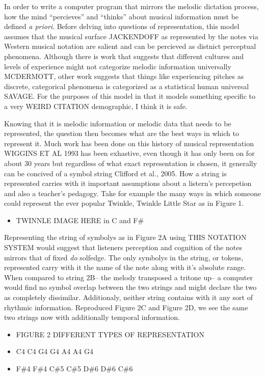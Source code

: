 \documentclass[]{book}
\providecommand{\tightlist}{%
  \setlength{\itemsep}{0pt}\setlength{\parskip}{0pt}}
\theoremstyle{definition}
\theoremstyle{definition}
\theoremstyle{definition}
\theoremstyle{remark}
\begin{document}
In order to write a computer program that mirrors the melodic dictation
process, how the mind ``percieves'' and ``thinks'' about musical
information must be defined \emph{a priori}. Before delving into
questions of representation, this model assumes that the musical surface
JACKENDOFF as represented by the notes via Western musical notation are
salient and can be percieved as distnict perceptual phenomena. Although
there is work that suggests that different cultures and levels of
experience might not categorize melodic information universally
MCDERMOTT, other work suggests that things like experiencing pitches as
discrete, categorical phenomena is categorized as a statistical human
universal SAVAGE. For the purposes of this model in that it models
something specific to a very WEIRD CITATION demographic, I think it is
safe.

Knowing that it is melodic information or melodic data that needs to be
represented, the question then becomes what are the best ways in which
to represent it. Much work has been done on this history of musical
representation WIGGINS ET AL 1993 has been exhastive, even though it has
only been on for about 30 years but regardless of what exact
representation is chosen, it generally can be concived of a symbol
string Clifford et al., 2005. How a string is represented carries with
it important assumptions about a listern's percepetion and also a
teacher's pedagogy. Take for example the many ways in which someone
could represent the ever popular Twinkle, Twinkle Little Star as in
Figure 1.

\begin{itemize}
\tightlist
\item
  TWINNLE IMAGE HERE in C and F\#
\end{itemize}

Representing the string of symbolys as in Figure 2A using THIS NOTATION
SYSTEM would suggest that listeners perception and cognition of the
notes mirrors that of fixed \emph{do} solfedge. The only symbolys in the
string, or tokens, represented carry with it the name of the note along
with it's absolute range. When compared to string 2B-- the melody
transposed a tritone up-- a computer would find no symbol overlap
between the two strings and might declare the two as completely
dissimilar. Additionaly, neither string contains with it any sort of
rhythmic information. Reproduced Figure 2C and Figure 2D, we see the
same two strings now with additionally temporal information.

\begin{itemize}
\tightlist
\item
  FIGURE 2 DIFFERENT TYPES OF REPRESENTATION
\item
  C4 C4 G4 G4 A4 A4 G4
\item
  F\#4 F\#4 C\#5 C\#5 D\#6 D\#6 C\#6
\end{itemize}
\end{document}
